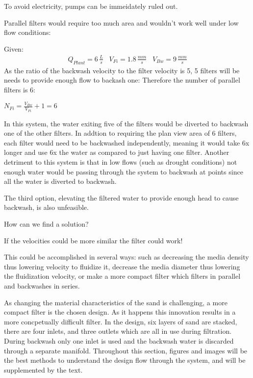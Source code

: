 \documentclass[letterpaper,10pt,english]{sphinxmanual}
\begin{document}

To avoid electricity, pumps can be immeidately ruled out.

Parallel filters would require too much area and wouldn’t work well under low flow conditions:

Given:
\begin{equation}\label{equation:Filtration/Filtration_Design:filter_base_conditions}
\begin{split}  Q_{Plant} = 6 \, \frac{L}{s} \,\,\,\,\, V_{Fi} = 1.8 \, \frac{mm}{s} \,\,\,\,\, V_{Bw} = 9 \, \frac{mm}{s}\end{split}
\end{equation}
As the ratio of the backwash velocity to the filter velocity is 5, 5 filters will be needs to provide enough flow to backash one: Therefore the number of parallel filters is 6:

\(N_{Fi} = \frac{V_{Bw}}{V_{Fi}} + 1 = 6\)

In this system, the water exiting five of the filters would be diverted to backwash one of the other filters. In addtion to requiring the plan view area of 6 filters, each filter would need to be backwashed independently, meaning it would take 6x longer and use 6x the water as compared to just having one filter. Another detriment to this system is that in low flows (such as drought conditions) not enough water would be passing through the system to backwash at points since all the water is diverted to backwash.

The third option, elevating the filtered water to provide enough head to cause backwash, is also unfeasible.


How can we find a solution?

If the velocities could be more similar the filter could work!

This could be accomplished in several ways: such as decreasing the media density thus lowering velocity to fluidize it, decrease the media diameter thus lowering the fluidization velocity, or make a more compact filter which filters in parallel and backwashes in series.

As changing the material characteristics of the sand is challenging, a more compact filter is the chosen design. As it happens this innovation results in a more concpetually difficult filter. In the design, six layers of sand are stacked, there are four inlets, and three outlets which are all in use during filtration. During backwash only one inlet is used and the backwash water is discarded through a separate manifold. Throughout this section, figures and images will be the best methods to understand the design flow through the system, and will be supplemented by the text.
\end{document}
